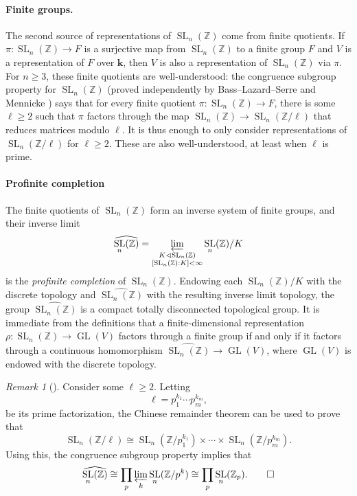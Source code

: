\documentclass[11pt]{article}
\numberwithin{equation}{section}
\theoremstyle{plain}
\theoremstyle{definition}
\theoremstyle{remark}
\newtheorem{rmk}[theorem]{Remark}
\newenvironment{remark}[1][]{\begin{rmk}[#1] \pushQED{\qed}}{\popQED \end{rmk}}
\DeclareMathOperator{\GL}{GL}
\DeclareMathOperator{\SL}{SL}
\newcommand\Z{\ensuremath{\mathbb{Z}}}
\newcommand\bk{\ensuremath{\mathbf{k}}}
\newcommand\tSLn{\ensuremath{\widehat{\SL_n(\Z)}}}
\begin{document}
\paragraph{Finite groups.}
The second source of representations of $\SL_n(\Z)$ come from finite quotients.  If
$\pi\colon \SL_n(\Z) \rightarrow F$ is a surjective map from $\SL_n(\Z)$ to a finite group $F$ and
$V$ is a representation of $F$ over $\bk$, then $V$ is also a representation of
$\SL_n(\Z)$ via $\pi$.  For $n \geq 3$, these finite quotients are well-understood:
the congruence subgroup property for $\SL_n(\Z)$ (proved
independently by Bass--Lazard--Serre \cite{BassLazardSerre} and Mennicke \cite{Mennicke}) says that
for every finite quotient $\pi\colon \SL_n(\Z) \rightarrow F$, there is some $\ell \geq 2$ such that
$\pi$ factors through the map
$\SL_n(\Z) \longrightarrow \SL_n(\Z/\ell)$
that reduces matrices modulo $\ell$.  It is thus enough to only consider representations
of $\SL_n(\Z/\ell)$ for $\ell \geq 2$.  These are also well-understood, at least when $\ell$ is prime.

\paragraph{Profinite completion}
The finite quotients of $\SL_n(\Z)$ form an inverse system of finite groups, and their inverse
limit 
\[\tSLn = \varprojlim_{\substack{K \lhd \SL_n(\Z) \\ [\SL_n(\Z):K] < \infty}} \SL_n(\Z)/K\]
is the {\em profinite completion} of $\SL_n(\Z)$.  Endowing each $\SL_n(\Z)/K$ with the discrete topology and
$\tSLn$ with the resulting inverse limit topology, the group $\tSLn$ is a compact totally disconnected
topological group.  It is immediate from the definitions that a finite-dimensional representation
$\rho\colon \SL_n(\Z) \rightarrow \GL(V)$ factors through a finite group if and only if it
factors through a continuous homomorphism $\tSLn \rightarrow \GL(V)$, where $\GL(V)$ is endowed
with the discrete topology.

\begin{remark}
Consider some $\ell \geq 2$.  Letting
\[\ell = p_1^{k_1} \cdots p_m^{k_m},\]
be its prime factorization, the Chinese remainder theorem can be used to prove that
\[\SL_n(\Z/\ell) \cong \SL_n(\Z/p_1^{k_1}) \times \cdots \times \SL_n(\Z/p_m^{k_m}).\]
Using this, the congruence subgroup property implies that
\[\tSLn \cong \prod_p \varprojlim_k \SL_n(\Z/p^k) \cong \prod_p \SL_n(\Z_p).\qedhere\]
\end{remark}
\end{document}
